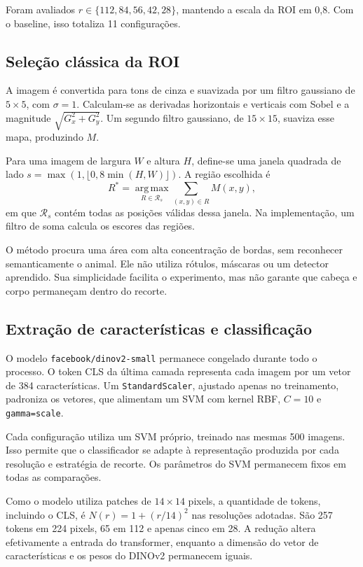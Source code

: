 \documentclass[conference]{IEEEtran}
\begin{document}
Foram avaliados $r\in\{112,84,56,42,28\}$, mantendo a escala da ROI
em 0,8. Com o baseline, isso totaliza 11 configurações.

\subsection{Seleção clássica da ROI}
A imagem é convertida para tons de cinza e suavizada por um filtro
gaussiano de $5\times5$, com $\sigma=1$. Calculam-se as derivadas
horizontais e verticais com Sobel e a magnitude
$\sqrt{G_x^2+G_y^2}$. Um segundo filtro gaussiano, de $15\times15$,
suaviza esse mapa, produzindo $M$.

Para uma imagem de largura $W$ e altura $H$, define-se uma janela
quadrada de lado $s=\max(1,\lfloor0{,}8\min(H,W)\rfloor)$.
A região escolhida é
\begin{equation}
R^*=\underset{R\in\mathcal{R}_s}{\operatorname{arg\,max}}
\sum_{(x,y)\in R} M(x,y),
\end{equation}
em que $\mathcal{R}_s$ contém todas as posições válidas dessa janela.
Na implementação, um filtro de soma calcula os escores das regiões.

O método procura uma área com alta concentração de bordas, sem
reconhecer semanticamente o animal. Ele não utiliza rótulos, máscaras
ou um detector aprendido. Sua simplicidade facilita o experimento,
mas não garante que cabeça e corpo permaneçam dentro do recorte.

\subsection{Extração de características e classificação}
O modelo \texttt{facebook/dinov2-small} permanece congelado durante
todo o processo. O token CLS da última camada representa cada imagem
por um vetor de 384 características. Um \texttt{StandardScaler},
ajustado apenas no treinamento, padroniza os vetores, que alimentam
um SVM com kernel RBF, $C=10$ e \texttt{gamma=scale}.

Cada configuração utiliza um SVM próprio, treinado nas mesmas 500
imagens. Isso permite que o classificador se adapte à representação
produzida por cada resolução e estratégia de recorte. Os parâmetros
do SVM permanecem fixos em todas as comparações.

Como o modelo utiliza patches de $14\times14$ pixels, a quantidade
de tokens, incluindo o CLS, é $N(r)=1+(r/14)^2$ nas resoluções adotadas.
São 257 tokens em 224 pixels, 65 em 112 e apenas cinco em 28.
A redução altera efetivamente a entrada do transformer, enquanto a
dimensão do vetor de características e os pesos do DINOv2 permanecem iguais.
\end{document}
